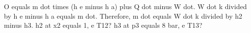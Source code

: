 O equals m dot times (h e minus h a) plus Q dot minus W dot. W dot k divided by h e minus h a equals m dot. Therefore, m dot equals W dot k divided by h2 minus h3. h2 at x2 equals 1, e T12? h3 at p3 equals 8 bar, e T13?